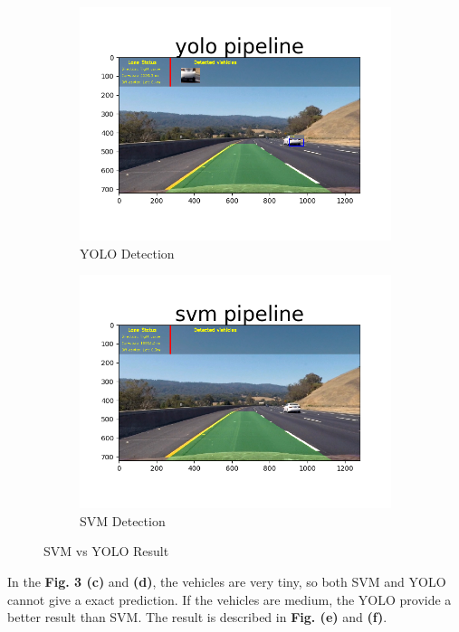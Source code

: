 \documentclass[conference]{IEEEtran}
\begin{document}
\begin{figure}[h]
\begin{subfigure}[t]{0.2\textwidth}
		\includegraphics[scale=0.2]{figures/yolo_test_04.png}
		\caption{YOLO Detection}
	\end{subfigure}%
	\begin{subfigure}[t]{0.2\textwidth} 
		\centering
		\includegraphics[scale=0.2]{figures/svm_test_04.png}
		\caption{SVM Detection}
	\end{subfigure}%
	\caption{SVM vs YOLO Result}
\end{figure}

In the \textbf{Fig. 3 (c)} and \textbf{(d)}, the vehicles are very tiny, so both SVM and YOLO cannot give a exact prediction. If the vehicles are medium, the YOLO provide a better result than SVM. The result is described in \textbf{Fig. (e)} and \textbf{(f)}.
\end{document}
